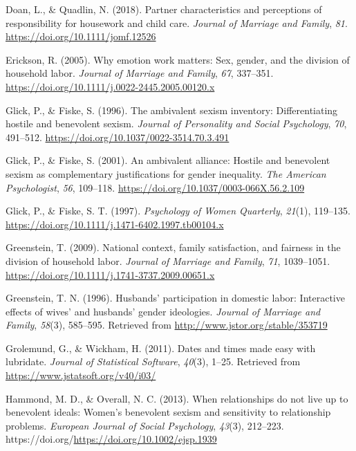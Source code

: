 \documentclass[
  man]{apa6}
\newlength{\cslhangindent}
\newlength{\cslentryspacingunit} %
\newenvironment{CSLReferences}[2] %
 {%
  \setlength{\parindent}{0pt}
  \ifodd #1
  \let\oldpar\par
  \def\par{\hangindent=\cslhangindent\oldpar}
  \fi
  \setlength{\parskip}{#2\cslentryspacingunit}
 }%
 {}
\begin{document}
\begin{CSLReferences}{1}{0}
\leavevmode{}%
Doan, L., \& Quadlin, N. (2018). Partner characteristics and perceptions of responsibility for housework and child care. \emph{Journal of Marriage and Family}, \emph{81}. \url{https://doi.org/10.1111/jomf.12526}

\leavevmode{}%
Erickson, R. (2005). Why emotion work matters: Sex, gender, and the division of household labor. \emph{Journal of Marriage and Family}, \emph{67}, 337--351. \url{https://doi.org/10.1111/j.0022-2445.2005.00120.x}

\leavevmode{}%
Glick, P., \& Fiske, S. (1996). The ambivalent sexism inventory: Differentiating hostile and benevolent sexism. \emph{Journal of Personality and Social Psychology}, \emph{70}, 491--512. \url{https://doi.org/10.1037/0022-3514.70.3.491}

\leavevmode{}%
Glick, P., \& Fiske, S. (2001). An ambivalent alliance: Hostile and benevolent sexism as complementary justifications for gender inequality. \emph{The American Psychologist}, \emph{56}, 109--118. \url{https://doi.org/10.1037/0003-066X.56.2.109}

\leavevmode{}%
Glick, P., \& Fiske, S. T. (1997). \emph{Psychology of Women Quarterly}, \emph{21}(1), 119--135. \url{https://doi.org/10.1111/j.1471-6402.1997.tb00104.x}

\leavevmode{}%
Greenstein, T. (2009). National context, family satisfaction, and fairness in the division of household labor. \emph{Journal of Marriage and Family}, \emph{71}, 1039--1051. \url{https://doi.org/10.1111/j.1741-3737.2009.00651.x}

\leavevmode{}%
Greenstein, T. N. (1996). Husbands' participation in domestic labor: Interactive effects of wives' and husbands' gender ideologies. \emph{Journal of Marriage and Family}, \emph{58}(3), 585--595. Retrieved from \url{http://www.jstor.org/stable/353719}

\leavevmode{}%
Grolemund, G., \& Wickham, H. (2011). Dates and times made easy with {lubridate}. \emph{Journal of Statistical Software}, \emph{40}(3), 1--25. Retrieved from \url{https://www.jstatsoft.org/v40/i03/}

\leavevmode{}%
Hammond, M. D., \& Overall, N. C. (2013). When relationships do not live up to benevolent ideals: Women's benevolent sexism and sensitivity to relationship problems. \emph{European Journal of Social Psychology}, \emph{43}(3), 212--223. https://doi.org/\url{https://doi.org/10.1002/ejsp.1939}


\end{CSLReferences}
\end{document}
